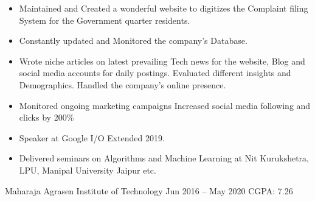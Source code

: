 \documentclass[10pt,a4paper,ragged2e]{altacv}
\begin{document}
\begin{itemize}
\item Maintained and Created a wonderful website to digitizes the Complaint filing System for the Government quarter residents. 
\item Constantly updated and Monitored the company’s Database.

\end{itemize}



\begin{itemize}
\item Wrote niche articles on latest prevailing Tech news for the website, Blog and social media accounts for daily postings.
Evaluated different insights and Demographics. Handled the company’s online presence.
 \item Monitored ongoing marketing campaigns
Increased social media following and clicks by 200\%

\end{itemize}
\divider



\begin{itemize}
    \item  \color{LightGrey} Speaker at \color{blue}G\color{red}o\color{yellow}o\color{blue}g\color{teal}l\color{red}e \color{LightGrey} I/O Extended 2019. 

    \item Delivered seminars on Algorithms and Machine Learning at Nit Kurukshetra, LPU, Manipal University Jaipur etc. 
    \end{itemize}

{\small{Maharaja Agrasen Institute of Technology}}
{ Jun 2016 -- May 2020 \hspace{1cm} CGPA: 7.26 }{}
\end{document}
